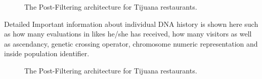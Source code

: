 \begin{figure}
	\centering
	\setlength\fboxsep{0pt}
	\caption{The Post-Filtering architecture for Tijuana restaurants.}
	\label{fig:postfiltering}     
\end{figure}


Detailed Important information about individual DNA history is shown here such as how many evaluations in likes he/she has received, how many visitors as well as ascendancy, genetic crossing operator, chromosome numeric representation and inside population identifier.


\begin{figure}
	\centering
	\setlength\fboxsep{0pt}
	\caption{The Post-Filtering architecture for Tijuana restaurants.}
	\label{fig:postfiltering}     
\end{figure}

